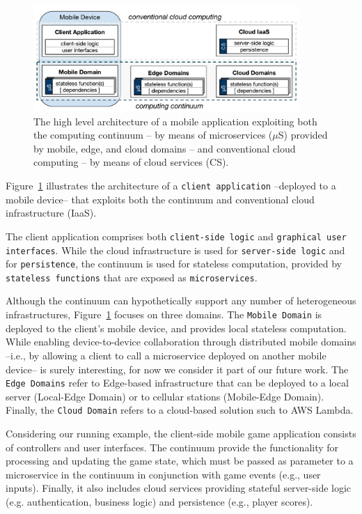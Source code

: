 \begin{figure}[tbp]
	\includegraphics[width=0.9\textwidth]{figs/Continuum-arch}
	\caption{The high level architecture of a mobile application exploiting both the computing continuum -- by means of microservices ($\mu$S) provided by mobile, edge, and cloud domains -- and conventional cloud computing -- by means of cloud services (CS).}
	\label{fig:Continuum-arch}
\end{figure}

Figure~\ref{fig:Continuum-arch} illustrates the architecture of a \texttt{client application} --deployed to a mobile device-- that exploits both the continuum and conventional cloud infrastructure (IaaS). 

The client application comprises both \texttt{client-side logic} and \texttt{graphical user interfaces}. While the cloud infrastructure is used for \texttt{server-side logic} and for \texttt{persistence}, the continuum is used for stateless computation, provided by \texttt{stateless functions} that are exposed as \texttt{microservices}.

Although the continuum can hypothetically support any number of heterogeneous infrastructures, Figure~\ref{fig:Continuum-arch} focuses on three domains. The \texttt{Mobile Domain} is deployed to the client's mobile device, and provides local stateless computation. While enabling device-to-device collaboration through distributed mobile domains --i.e., by allowing a client to call a microservice deployed on another mobile device-- is surely interesting, for now we consider it part of our future work. The \texttt{Edge Domains} refer to Edge-based infrastructure that can be deployed to a local server (Local-Edge Domain) or to cellular stations (Mobile-Edge Domain). Finally, the \texttt{Cloud Domain} refers to a cloud-based solution such to AWS Lambda.

Considering our running example, the client-side mobile game application consists of controllers and user interfaces. The continuum provide the functionality for processing and updating the game state, which must be passed as parameter to a microservice in the continuum in conjunction with game events (e.g., user inputs). Finally, it also includes cloud services providing stateful server-side logic (e.g. authentication, business logic) and persistence (e.g., player scores). 

